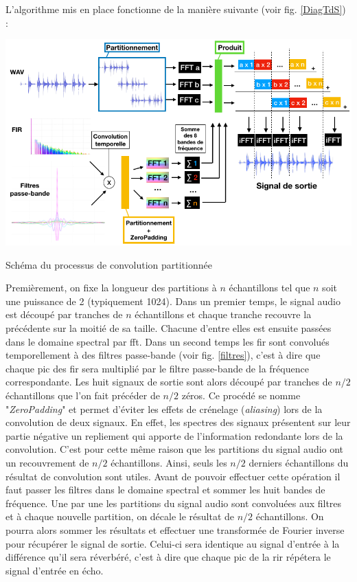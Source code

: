 L'algorithme mis en place fonctionne de la manière suivante (voir fig. \ref{DiagTdS}) :
\begin{figureth}
	\includegraphics[width=\linewidth]{images/DiagTdS}
	\caption{Schéma du processus de convolution partitionnée}
	\label{DiagTdS}
\end{figureth}

Premièrement, on fixe la longueur des partitions à $n$ échantillons tel que $n$ soit une puissance de 2 (typiquement 1024). Dans un premier temps, le signal audio est découpé par tranches de $n$ échantillons et chaque tranche recouvre la précédente sur la moitié de sa taille. Chacune d'entre elles est ensuite passées dans le domaine spectral par \gls{fft}. Dans un second temps les \gls{fir} sont convolués temporellement à des filtres passe-bande (voir fig. \ref{filtres}), c'est à dire que chaque pic des \gls{fir} sera multiplié par le filtre passe-bande de la fréquence correspondante. Les huit signaux de sortie sont alors découpé par tranches de $n/2$ échantillons que l'on fait précéder de $n/2$ zéros. Ce procédé se nomme "\textit{ZeroPadding}" et permet d'éviter les effets de crénelage (\textit{aliasing}) lors de la convolution de deux signaux. En effet, les spectres des signaux présentent sur leur partie négative un repliement qui apporte de l'information redondante lors de la convolution. C'est pour cette même raison que les partitions du signal audio ont un recouvrement de $n/2$ échantillons. Ainsi, seuls les $n/2$ derniers échantillons du résultat de convolution sont utiles. Avant de pouvoir effectuer cette opération il faut passer les filtres dans le domaine spectral et sommer les huit bandes de fréquence. Une par une les partitions du signal audio sont convoluées aux filtres et à chaque nouvelle partition, on décale le résultat de $n/2$ échantillons. On pourra alors sommer les résultats et effectuer une transformée de Fourier inverse pour récupérer le signal de sortie. Celui-ci sera identique au signal d'entrée à la différence qu'il sera réverbéré, c'est à dire que chaque pic de la \gls{rir} répétera le signal d'entrée en écho.

